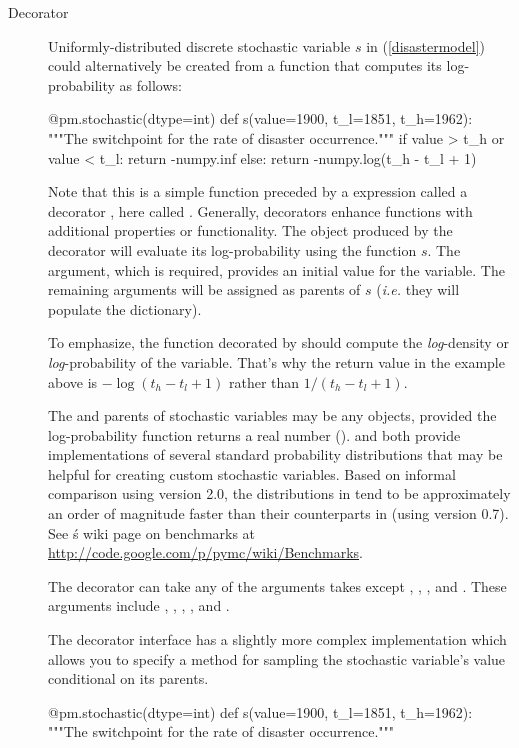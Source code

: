 \documentclass[]{jss}
\begin{document}
\begin{description}
    \item[Decorator] Uniformly-distributed discrete stochastic variable $s$ in (\ref{disastermodel}) could alternatively be created from a function that computes its log-probability as follows:
\begin{CodeInput}
@pm.stochastic(dtype=int)
def s(value=1900, t_l=1851, t_h=1962):
"""The switchpoint for the rate of disaster occurrence."""
if value > t_h or value < t_l:
    return -numpy.inf
else:
    return -numpy.log(t_h - t_l + 1)
\end{CodeInput}
Note that this is a simple  function preceded by a  expression called a decorator \citep{python}, here called . Generally, decorators enhance functions with additional properties or functionality. The  object produced by the  decorator will evaluate its log-probability using the function $s$. The  argument, which is required, provides an initial value for the variable. The remaining arguments will be assigned as parents of $s$ (\emph{i.e.} they will populate the  dictionary).

To emphasize, the  function decorated by  should compute the \emph{log}-density or \emph{log}-probability of the variable. That's why the return value in the example above is $-\log(t_h-t_l+1)$ rather than $1/(t_h-t_l+1)$.

The  and parents of stochastic variables may be any objects, provided the log-probability function returns a real number ().  and  both provide implementations of several standard probability distributions that may be helpful for creating custom stochastic variables. Based on informal comparison using version 2.0, the distributions in  tend to be approximately an order of magnitude faster than their counterparts in  (using version 0.7). See \'s wiki page on benchmarks at \href{http://code.google.com/p/pymc/wiki/Benchmarks}{http://code.google.com/p/pymc/wiki/Benchmarks}.

    The decorator  can take any of the arguments  takes except , , ,  and . These arguments include , , , ,  and .

    The decorator interface has a slightly more complex implementation which allows you to specify a  method for sampling the stochastic variable's value conditional on its parents.
    \begin{CodeInput}
@pm.stochastic(dtype=int)
def s(value=1900, t_l=1851, t_h=1962):
"""The switchpoint for the rate of disaster occurrence."""


\end{CodeInput}
\end{description}
\end{document}

